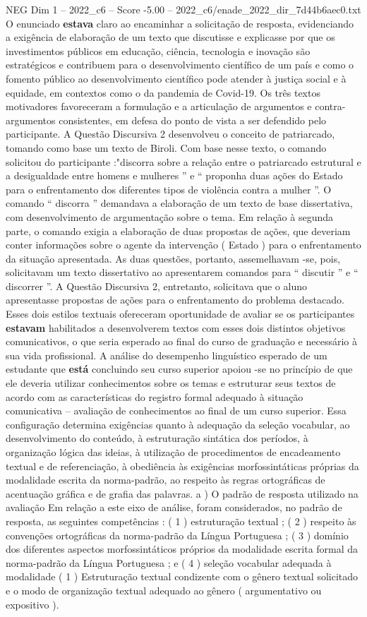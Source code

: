 \begin{textsample}{NEG Dim 1 – 2022\_c6 – Score -5.00 – 2022\_c6/enade\_2022\_dir\_7d44b6aec0.txt}
O enunciado \textbf{estava} claro ao encaminhar a solicitação de resposta, evidenciando a exigência de elaboração de um texto que discutisse e explicasse por que os investimentos públicos em educação, ciência, tecnologia e inovação são estratégicos e contribuem para o desenvolvimento científico de um país e como o fomento público ao desenvolvimento científico pode atender à justiça social e à equidade, em contextos como o da pandemia de Covid-19.
Os três textos motivadores favoreceram a formulação e a articulação de argumentos e contra-argumentos consistentes, em defesa do ponto de vista a ser defendido pelo participante.
A Questão Discursiva 2 desenvolveu o conceito de patriarcado, tomando como base um texto de Biroli.
Com base nesse texto, o comando solicitou do participante :"discorra sobre a relação entre o patriarcado estrutural e a desigualdade entre homens e mulheres ” e “ proponha duas ações do Estado para o enfrentamento dos diferentes tipos de violência contra a mulher ”.
O comando “ discorra ” demandava a elaboração de um texto de base dissertativa, com desenvolvimento de argumentação sobre o tema.
Em relação à segunda parte, o comando exigia a elaboração de duas propostas de ações, que deveriam conter informações sobre o agente da intervenção ( Estado ) para o enfrentamento da situação apresentada.
As duas questões, portanto, assemelhavam -se, pois, solicitavam um texto dissertativo ao apresentarem comandos para “ discutir ” e “ discorrer ”.
A Questão Discursiva 2, entretanto, solicitava que o aluno apresentasse propostas de ações para o enfrentamento do problema destacado.
Esses dois estilos textuais ofereceram oportunidade de avaliar se os participantes \textbf{estavam} habilitados a desenvolverem textos com esses dois distintos objetivos comunicativos, o que seria esperado ao final do curso de graduação e necessário à sua vida profissional.
A análise do desempenho linguístico esperado de um estudante que \textbf{está} concluindo seu curso superior apoiou -se no princípio de que ele deveria utilizar conhecimentos sobre os temas e estruturar seus textos de acordo com as características do registro formal adequado à situação comunicativa – avaliação de conhecimentos ao final de um curso superior.
Essa configuração determina exigências quanto à adequação da seleção vocabular, ao desenvolvimento do conteúdo, à estruturação sintática dos períodos, à organização lógica das ideias, à utilização de procedimentos de encadeamento textual e de referenciação, à obediência às exigências morfossintáticas próprias da modalidade escrita da norma-padrão, ao respeito às regras ortográficas de acentuação gráfica e de grafia das palavras. a ) O padrão de resposta utilizado na avaliação Em relação a este eixo de análise, foram considerados, no padrão de resposta, as seguintes competências : ( 1 ) estruturação textual ; ( 2 ) respeito às convenções ortográficas da norma-padrão da Língua Portuguesa ; ( 3 ) domínio dos diferentes aspectos morfossintáticos próprios da modalidade escrita formal da norma-padrão da Língua Portuguesa ; e ( 4 ) seleção vocabular adequada à modalidade ( 1 ) Estruturação textual condizente com o gênero textual solicitado e o modo de organização textual adequado ao gênero ( argumentativo ou expositivo ).

\end{textsample}

